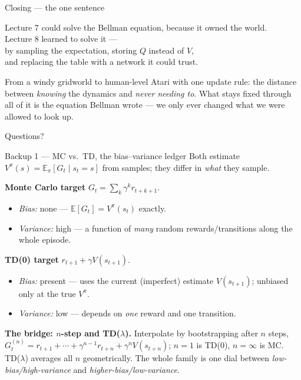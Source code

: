 \documentclass[10pt, aspectratio=169]{beamer}
\begin{document}
\begin{frame}{Closing --- the one sentence}
\vfill
\begin{center}\large
Lecture 7 could solve the Bellman equation, because it owned the world.\\[8pt]
Lecture 8 \alert{learned} to solve it ---\\[4pt]
by sampling the expectation, storing $Q$ instead of $V$,\\[4pt]
and replacing the table with a network it could trust.
\end{center}
\vfill
\pause
\footnotesize
From a windy gridworld to human-level Atari with one update rule: the distance between \emph{knowing} the dynamics and \emph{never needing to}. What stays fixed through all of it is the equation Bellman wrote --- we only ever changed what we were allowed to look up.
\end{frame}

\begin{frame}[standout]
Questions?
\end{frame}

\appendix

\begin{frame}{Backup 1 --- MC vs.\ TD, the bias--variance ledger}
\footnotesize
Both estimate $V^\pi(s)=\mathbb{E}_\pi[G_t\mid s_t=s]$ from samples; they differ in \emph{what} they sample.
\medskip

\textbf{Monte Carlo target} $G_t = \sum_{k} \gamma^k r_{t+k+1}$.
\begin{itemize}\setlength\itemsep{1pt}
\item \emph{Bias:} none --- $\mathbb{E}[G_t]=V^\pi(s_t)$ exactly.
\item \emph{Variance:} high --- a function of \emph{many} random rewards/transitions along the whole episode.
\end{itemize}
\medskip
\textbf{TD(0) target} $r_{t+1}+\gamma V(s_{t+1})$.
\begin{itemize}\setlength\itemsep{1pt}
\item \emph{Bias:} present --- uses the current (imperfect) estimate $V(s_{t+1})$; unbiased only at the true $V^\pi$.
\item \emph{Variance:} low --- depends on \emph{one} reward and one transition.
\end{itemize}
\medskip
\textbf{The bridge: $n$-step and TD($\lambda$).} Interpolate by bootstrapping after $n$ steps,
$G_t^{(n)} = r_{t+1}+\cdots+\gamma^{n-1}r_{t+n}+\gamma^n V(s_{t+n})$; $n{=}1$ is TD(0), $n{=}\infty$ is MC. TD($\lambda$) averages all $n$ geometrically. The whole family is one dial between \emph{low-bias/high-variance} and \emph{higher-bias/low-variance}.
\end{frame}
\end{document}
